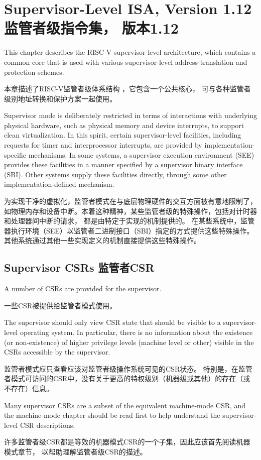 \chapter{Supervisor-Level ISA, Version 1.12 监管者级指令集， 版本1.12}
\label{supervisor}

This chapter describes the RISC-V supervisor-level architecture, which
contains a common core that is used with various supervisor-level
address translation and protection schemes.

本章描述了RISC-V监管者级体系结构 ，它包含一个公共核心，
可与各种监管者级别地址转换和保护方案一起使用。

\begin{commentary}
  Supervisor mode is deliberately restricted in terms of interactions
  with underlying physical hardware, such as physical memory and device
  interrupts, to support clean virtualization.
  In this spirit, certain supervisor-level facilities, including requests for
  timer and interprocessor interrupts, are provided by implementation-specific
  mechanisms.  In some systems, a supervisor execution environment (SEE)
  provides these facilities in a manner specified by a supervisor binary
  interface (SBI).  Other systems supply these facilities directly, through some
  other implementation-defined mechanism.

  为实现干净的虚拟化，监管者模式在与底层物理硬件的交互方面被有意地限制了，
  如物理内存和设备中断。本着这种精神，某些监管者级的特殊操作，包括对计时器和处理器间中断的请求，
  都是由特定于实现的机制提供的。
  在某些系统中，监管器执行环境（SEE）以监管者二进制接口（SBI）指定的方式提供这些特殊操作。
  其他系统通过其他一些实现定义的机制直接提供这些特殊操作。
\end{commentary}

\section{Supervisor CSRs 监管者CSR}

A number of CSRs are provided for the supervisor.

一些CSR被提供给监管者模式使用。

\begin{commentary}
  The supervisor should only view CSR state that should be visible to a
  supervisor-level operating system.  In particular, there is no
  information about the existence (or non-existence) of higher privilege
  levels (machine level or other) visible in the CSRs accessible by the
  supervisor.

监管者模式应只查看应该对监管者级操作系统可见的CSR状态。
特别是，在监管者模式可访问的CSR中，没有关于更高的特权级别（机器级或其他）的存在（或不存在）信息。

Many supervisor CSRs are a subset of the equivalent machine-mode CSR,
and the machine-mode chapter should be read first to help understand
the supervisor-level CSR descriptions.

许多监管者级CSR都是等效的机器模式CSR的一个子集，因此应该首先阅读机器模式章节，
以帮助理解监管者级CSR的描述。
\end{commentary}

